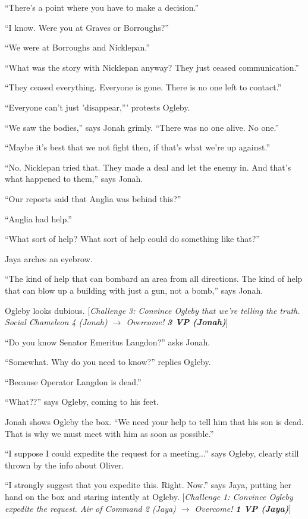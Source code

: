 ``There's a point where you have to make a decision.''

``I know.  Were you at Graves or Borroughs?''

``We were at Borroughs and Nicklepan.''

``What was the story with Nicklepan anyway?  They just ceased communication.''

``They ceased everything.  Everyone is gone.  There is no one left to contact.''

``Everyone can't just 'disappear,''' protests Ogleby.

``We saw the bodies,'' says Jonah grimly. ``There was no one alive.  No one.''

``Maybe it's best that we not fight then, if that's what we're up against.''

``No.  Nicklepan tried that.  They made a deal and let the enemy in.  And that's what happened to them,'' says Jonah.

``Our reports said that Anglia was behind this?''

``Anglia had help.''

``What sort of help?  What sort of help could do something like that?''

Jaya arches an eyebrow.

``The kind of help that can bombard an area from all directions.  The kind of help that can blow up a building with just a gun, not a bomb,'' says Jonah.

Ogleby looks dubious.  {[}\textit{Challenge 3: Convince Ogleby that we're telling the truth. Social Chameleon 4 (Jonah) $\rightarrow$ Overcome! }\textit{\textbf{3 VP (Jonah)}}{]} 



``Do you know Senator Emeritus Langdon?'' asks Jonah.

``Somewhat. Why do you need to know?'' replies Ogleby.

``Because Operator Langdon is dead.''

``What??'' says Ogleby, coming to his feet.

Jonah shows Ogleby the box.  ``We need your help to tell him that his son is dead.  That is why we must meet with him as soon as possible.''

``I suppose I could expedite the request for a meeting...'' says Ogleby, clearly still thrown by the info about Oliver.

``I strongly suggest that you expedite this. Right.  Now.'' says Jaya, putting her hand on the box and staring intently at Ogleby. {[}\textit{Challenge 1: Convince Ogleby expedite the request. Air of   Command 2 (Jaya) $\rightarrow$ Overcome! }\textit{\textbf{1 VP (Jaya)}}{]} 

